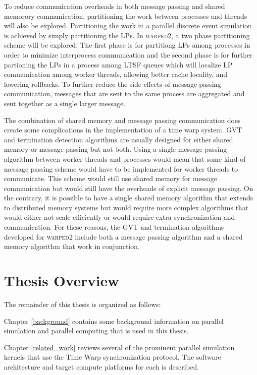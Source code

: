 \documentclass[11pt]{book}
\begin{document}
To reduce communication overheads in both message passing and shared memorory communication,
partitioning the work between processes and threads will also be explored. Partitioning
the work in a parallel discrete event simulation is achieved by simply partitioning the
LPs. In \textsc{warped2}, a two phase partitioning scheme will be explored. The first phase
is for partitiong LPs among processes in order to minimize interprocess communication and the
second phase is for further partioning the LPs in a process among LTSF queues
which will localize LP communication among worker threads, allowing better cache locality,
and lowering rollbacks. To further reduce the side effects of message passing communication,
messages that are sent to the same process are aggregated and sent together as a single larger
message.

The combination of shared memory and message passing communication does create some
complications in the implementation of a time warp system. GVT and termination detection
algorithms are usually designed for either shared memory or message passing but not both.
Using a single message passing algorithm between worker threads and processes would mean
that some kind of message passing scheme would have to be implemented for worker threads
to communicate. This scheme would still use shared memory for message communication but
would still have the overheads of explicit message passing. On the contrary, it is possible
to have a single shared memory algorithm that extends to distributed memory systems but
would require more complex algorithms that would either not scale efficiently or would require
extra synchronization and communication. For these reasons, the GVT and termination algorithms
developed for \textsc{warped2} include both a message passing algorithm and a shared memory
algorithm that work in conjunction.

\section{Thesis Overview}

The remainder of this thesis is organized as follows:

Chapter \ref{background} contains some background information on parallel simulation and
parallel computing that is used in this thesis.

Chapter \ref{related_work} reviews several of the prominent parallel simulation kernels
that use the Time Warp synchronization protocol. The software architecture and target
compute platforms for each is described.
\end{document}
